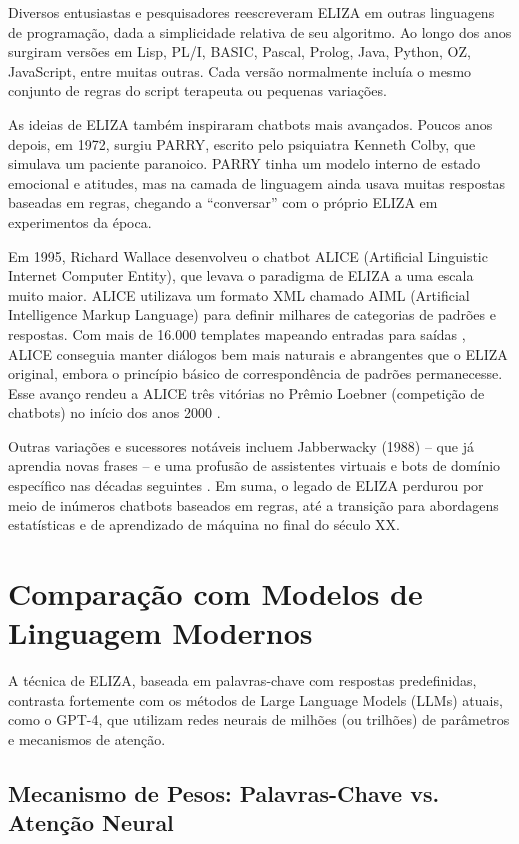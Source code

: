 \documentclass[14pt,a4paper,oneside]{book}
\begin{document}
Diversos entusiastas e pesquisadores reescreveram ELIZA em outras linguagens de programação, dada a simplicidade relativa de seu algoritmo. Ao longo dos anos surgiram versões em Lisp, PL/I, BASIC, Pascal, Prolog, Java, Python, OZ, JavaScript, entre muitas outras. Cada versão normalmente incluía o mesmo conjunto de regras do script terapeuta ou pequenas variações.

As ideias de ELIZA também inspiraram chatbots mais avançados. Poucos anos depois, em 1972, surgiu PARRY, escrito pelo psiquiatra Kenneth Colby, que simulava um paciente paranoico. PARRY tinha um modelo interno de estado emocional e atitudes, mas na camada de linguagem ainda usava muitas respostas baseadas em regras, chegando a “conversar” com o próprio ELIZA em experimentos da época.

Em 1995, Richard Wallace desenvolveu o chatbot ALICE (Artificial Linguistic Internet Computer Entity), que levava o paradigma de ELIZA a uma escala muito maior. ALICE utilizava um formato XML chamado AIML (Artificial Intelligence Markup Language) para definir milhares de categorias de padrões e respostas. Com mais de 16.000 templates mapeando entradas para saídas \cite{Wallace2000}, ALICE conseguia manter diálogos bem mais naturais e abrangentes que o ELIZA original, embora o princípio básico de correspondência de padrões permanecesse. Esse avanço rendeu a ALICE três vitórias no Prêmio Loebner (competição de chatbots) no início dos anos 2000 \cite{Wallace2000}.

Outras variações e sucessores notáveis incluem Jabberwacky (1988) – que já aprendia novas frases – e uma profusão de assistentes virtuais e bots de domínio específico nas décadas seguintes \cite{Wallace2000}. Em suma, o legado de ELIZA perdurou por meio de inúmeros chatbots baseados em regras, até a transição para abordagens estatísticas e de aprendizado de máquina no final do século XX.

\section{Comparação com Modelos de Linguagem Modernos}

A técnica de ELIZA, baseada em palavras-chave com respostas predefinidas, contrasta fortemente com os métodos de Large Language Models (LLMs) atuais, como o GPT-4, que utilizam redes neurais de milhões (ou trilhões) de parâmetros e mecanismos de atenção.

\subsection{Mecanismo de Pesos: Palavras-Chave vs. Atenção Neural}
\end{document}
